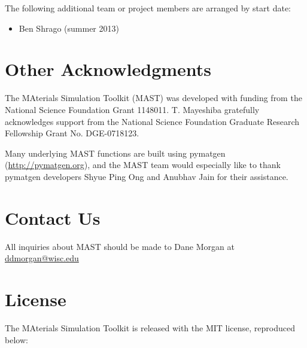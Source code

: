 \documentclass[letterpaper,10pt,english]{sphinxmanual}
\begin{document}
The following additional team or project members are arranged by start date:
\begin{itemize}
\item {} 
Ben Shrago (summer 2013)

\end{itemize}


\chapter{Other Acknowledgments}
\label{10_0_acknowledgments:other-acknowledgments}

The MAterials Simulation Toolkit (MAST) was developed with funding from the National Science Foundation Grant 1148011. T. Mayeshiba gratefully acknowledges support from the National Science Foundation Graduate Research Fellowship Grant No. DGE-0718123.


Many underlying MAST functions are built using pymatgen (\href{http://pymatgen.org}{http://pymatgen.org}), and the MAST team would especially like to thank pymatgen developers Shyue Ping Ong and Anubhav Jain for their assistance.


\chapter{Contact Us}
\label{14_0_contact:contact-us}\label{14_0_contact::doc}
All inquiries about MAST should be made to Dane Morgan at \href{mailto:ddmorgan@wisc.edu}{ddmorgan@wisc.edu}


\chapter{License}
\label{11_0_license::doc}\label{11_0_license:license}
The MAterials Simulation Toolkit is released with the MIT license, reproduced below:
\end{document}
